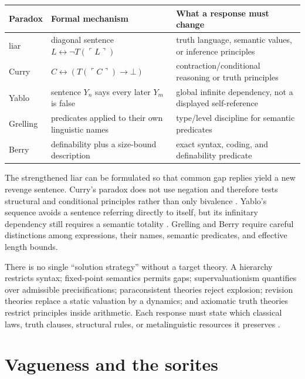 \begin{center}
\begin{tabularx}{\textwidth}{@{}l X X@{}}
\toprule
Paradox & Formal mechanism & What a response must change \\
\midrule
liar & diagonal sentence \(L\leftrightarrow\neg T(\ulcorner L\urcorner)\) & truth language, semantic values, or inference principles \\
Curry & \(C\leftrightarrow(T(\ulcorner C\urcorner)\to\bot)\) & contraction/conditional reasoning or truth principles \\
Yablo & sentence \(Y_n\) says every later \(Y_m\) is false & global infinite dependency, not a displayed self-reference \\
Grelling & predicates applied to their own linguistic names & type/level discipline for semantic predicates \\
Berry & definability plus a size-bound description & exact syntax, coding, and definability predicate \\
\bottomrule
\end{tabularx}
\end{center}

The strengthened liar can be formulated so that common gap replies yield a
new revenge sentence. Curry's paradox does not use negation and therefore
tests structural and conditional principles rather than only bivalence
\cite{Curry1942}. Yablo's sequence avoids a sentence referring directly to
itself, but its infinitary dependency still requires a semantic totality
\cite{Yablo1993}. Grelling and Berry require careful distinctions among
expressions, their names, semantic predicates, and effective length bounds.

There is no single ``solution strategy'' without a target theory. A hierarchy
restricts syntax; fixed-point semantics permits gaps; supervaluationism
quantifies over admissible precisifications; paraconsistent theories reject
explosion; revision theories replace a static valuation by a dynamics; and
axiomatic truth theories restrict principles inside arithmetic. Each response
must state which classical laws, truth clauses, structural rules, or
metalinguistic resources it preserves \cite{Priest2006,
BeallGlanzbergRipley2018}.

\section{Vagueness and the sorites}
\label{sec:p11-vagueness}

